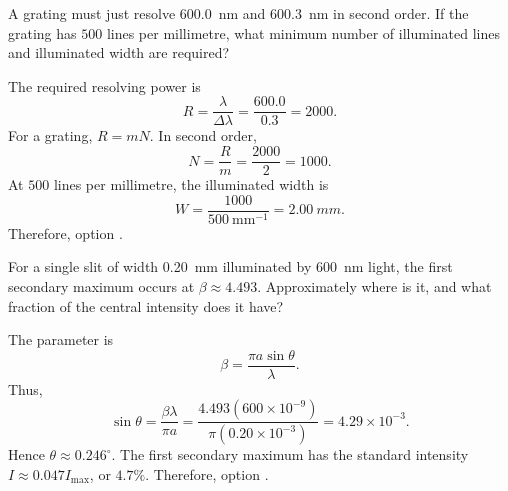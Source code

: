 \begin{quizquestion}[
  id=phy104-opt-057,
  topic=optics,
  difficulty=challenge,
  marks=3,
  correct=C,
  tags={diffraction-grating,resolving-power,illuminated-width},
  outcome={Determine grating line count and illuminated width for resolution}
]
  A grating must just resolve \SI{600.0}{nm} and \SI{600.3}{nm} in second order. If the grating has \(500\) lines per millimetre, what minimum number of illuminated lines and illuminated width are required?
\end{quizquestion}
\begin{quizsolution}
  The required resolving power is
    \[
      R=\frac{\lambda}{\Delta\lambda}
      =\frac{600.0}{0.3}=2000.
    \]
    For a grating, \(R=mN\). In second order,
    \[
      N=\frac{R}{m}=\frac{2000}{2}=1000.
    \]
    At \(500\) lines per millimetre, the illuminated width is
    \[
      W=\frac{1000}{500\ \mathrm{mm}^{-1}}=\SI{2.00}{mm}.
    \]
    Therefore, option \textbf{\quizcorrectletter}.
\end{quizsolution}

\begin{quizquestion}[
  id=phy104-opt-058,
  topic=optics,
  difficulty=challenge,
  marks=3,
  correct=D,
  tags={single-slit,secondary-maximum,intensity},
  outcome={Locate a secondary diffraction maximum and its intensity}
]
  For a single slit of width \SI{0.20}{mm} illuminated by \SI{600}{nm} light, the first secondary maximum occurs at \(\beta\approx4.493\). Approximately where is it, and what fraction of the central intensity does it have?
\end{quizquestion}
\begin{quizsolution}
  The parameter is
    \[
      \beta=\frac{\pi a\sin\theta}{\lambda}.
    \]
    Thus,
    \[
      \sin\theta=\frac{\beta\lambda}{\pi a}
      =\frac{4.493(600\times10^{-9})}{\pi(0.20\times10^{-3})}
      =4.29\times10^{-3}.
    \]
    Hence \(\theta\approx0.246^\circ\). The first secondary maximum has the standard intensity \(I\approx0.047I_{\max}\), or \(4.7\%\). Therefore, option \textbf{\quizcorrectletter}.
\end{quizsolution}

